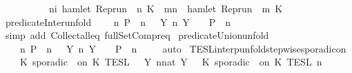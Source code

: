\begin{isabellebody}
\ \ \ \ \ \ \ \ {\isacharbraceleft}\ {\isasymrho}{\isachardot}\ {\isasymforall}n{\isasymge}i{\isachardot}\ hamlet\ {\isacharparenleft}{\isacharparenleft}Rep{\isacharunderscore}run\ {\isasymrho}{\isacharparenright}\ n\ K\ {\isasymlongrightarrow}\ {\isacharparenleft}{\isasymforall}m{\isasymge}n{\isachardot}\ {\isasymnot}\ hamlet\ {\isacharparenleft}{\isacharparenleft}Rep{\isacharunderscore}run\ {\isasymrho}{\isacharparenright}\ m\ K\ {\isacharbraceright}{\isacartoucheclose}\isanewline
\isanewline
\isanewline
{}\isamarkupfalse%
\ predicate{\isacharunderscore}Inter{\isacharunderscore}unfold{\isacharcolon}\isanewline
\ \ {\isacartoucheopen}{\isacharbraceleft}\ {\isasymrho}{\isachardot}\ {\isasymforall}n{\isachardot}\ P\ {\isasymrho}\ n{\isacharbraceright}\ {\isacharequal}\ {\isasymInter}\ {\isacharbraceleft}Y{\isachardot}\ {\isasymexists}n{\isachardot}\ Y\ {\isacharequal}\ {\isacharbraceleft}\ {\isasymrho}{\isachardot}\ P\ {\isasymrho}\ n\ {\isacharbraceright}{\isacharbraceright}{\isacartoucheclose}\isanewline
%
\isadelimproof
\ \ %
\endisadelimproof
%
\isatagproof
{}\isamarkupfalse%
\ {\isacharparenleft}simp\ add{\isacharcolon}\ Collect{\isacharunderscore}all{\isacharunderscore}eq\ full{\isacharunderscore}SetCompr{\isacharunderscore}eq{\isacharparenright}%
\endisatagproof
{\isafoldproof}%
%
\isadelimproof
\isanewline
%
\endisadelimproof
\isanewline
{}\isamarkupfalse%
\ predicate{\isacharunderscore}Union{\isacharunderscore}unfold{\isacharcolon}\isanewline
\ \ {\isacartoucheopen}{\isacharbraceleft}\ {\isasymrho}{\isachardot}\ {\isasymexists}n{\isachardot}\ P\ {\isasymrho}\ n{\isacharbraceright}\ {\isacharequal}\ {\isasymUnion}\ {\isacharbraceleft}Y{\isachardot}\ {\isasymexists}n{\isachardot}\ Y\ {\isacharequal}\ {\isacharbraceleft}\ {\isasymrho}{\isachardot}\ P\ {\isasymrho}\ n\ {\isacharbraceright}{\isacharbraceright}{\isacartoucheclose}\isanewline
%
\isadelimproof
\ \ %
\endisadelimproof
%
\isatagproof
{}\isamarkupfalse%
\ auto%
\endisatagproof
{\isafoldproof}%
%
\isadelimproof
\isanewline
%
\endisadelimproof
\isanewline
{}\isamarkupfalse%
\ TESL{\isacharunderscore}interp{\isacharunderscore}unfold{\isacharunderscore}stepwise{\isacharunderscore}sporadicon{\isacharcolon}\isanewline
\ \ \ {\isacartoucheopen}{\isasymlbrakk}\ K\ sporadic\ {\isasymtau}\ on\ K\ {\isasymrbrakk}\isactrlsub T\isactrlsub E\isactrlsub S\isactrlsub L\ {\isacharequal}\ {\isasymUnion}\ {\isacharbraceleft}Y{\isachardot}\ {\isasymexists}n{\isacharcolon}{\isacharcolon}nat{\isachardot}\ Y\ {\isacharequal}\ {\isasymlbrakk}\ K\ sporadic\ {\isasymtau}\ on\ K\ {\isasymrbrakk}\isactrlsub T\isactrlsub E\isactrlsub S\isactrlsub L\isactrlbsup {\isasymge}\ n\isactrlesup {\isacharbraceright}{\isacartoucheclose}\isanewline

\end{isabellebody}
